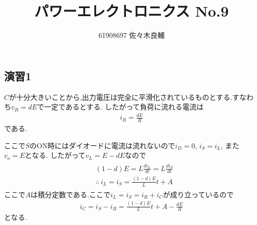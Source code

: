 \documentclass[uplatex,a4j,11pt,dvipdfmx]{jsarticle}
\begin{document}
\title{パワーエレクトロニクス No.9}
\author{61908697 佐々木良輔}
\date{}
\maketitle
\subsection*{演習1}
$C$が十分大きいことから,出力電圧は完全に平滑化されているものとする.すなわち$v_R=dE$で一定であるとする.
したがって負荷に流れる電流は
\begin{align}
  i_R=\frac{dE}{R}
\end{align}
である.

ここで$S$のON時にはダイオードに電流は流れないので$i_D=0$, $i_S=i_L$, また$v_o=E$となる.
したがって$v_L=E-dE$なので
\begin{align}
  \begin{split}
    &(1-d)E=L\frac{di_L}{dt}=L\frac{di_S}{dt}\\
    &\therefore\ i_L=i_S=\frac{(1-d)E}{L}t+A
  \end{split}
\end{align}
ここで$A$は積分定数である.ここで$i_L=i_S=i_R+i_C$が成り立っているので
\begin{align}
  i_C=i_S-i_R=\frac{(1-d)E}{L}t+A-\frac{dE}{R}
\end{align}
となる.
\end{document}
